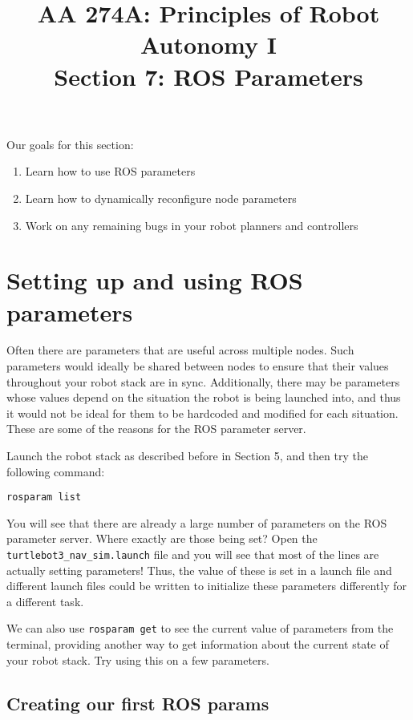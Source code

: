 \documentclass{article}
\title{AA 274A: Principles of Robot Autonomy I \\ Section 7: ROS Parameters}
\date{}
\begin{document}
\maketitle
\pagestyle{fancy}

Our goals for this section: \begin{enumerate}
	\item Learn how to use ROS parameters
    \item Learn how to dynamically reconfigure node parameters
    \item Work on any remaining bugs in your robot planners and controllers
\end{enumerate}

\section{Setting up and using ROS parameters}
Often there are parameters that are useful across multiple nodes. Such parameters would ideally be shared between nodes to ensure that their values throughout your robot stack are in sync. Additionally, there may be parameters whose values depend on the situation the robot is being launched into, and thus it would not be ideal for them to be hardcoded and modified for each situation. These are some of the reasons for the ROS parameter server.

Launch the robot stack as described before in Section 5, and then try the following command:
\begin{lstlisting}
rosparam list
\end{lstlisting}

You will see that there are already a large number of parameters on the ROS parameter server. Where exactly are those being set? Open the \texttt{turtlebot3\_nav\_sim.launch} file and you will see that most of the lines are actually setting parameters! Thus, the value of these is set in a launch file and different launch files could be written to initialize these parameters differently for a different task.

We can also use \texttt{rosparam get} to see the current value of parameters from the terminal, providing another way to get information about the current state of your robot stack. Try using this on a few parameters.

\subsection{Creating our first ROS params}
\end{document}
